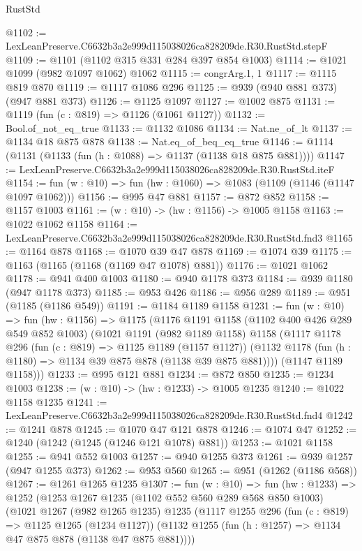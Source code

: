 \begin{lexlean}{RustStd}
\begin{coremodule}
@1102 := LexLeanPreserve.C6632b3a2e999d115038026ca828209de.R30.RustStd.stepF
@1109 := @1101 (@1102 @315 @331 @284 @397 @854 @1003)
@1114 := @1021 @1099 (@982 @1097 @1062) @1062
@1115 := congrArg.{1, 1}
@1117 := @1115 @819 @870
@1119 := @1117 @1086 @296
@1125 := @939 (@940 @881 @373) (@947 @881 @373)
@1126 := @1125 @1097
@1127 := @1002 @875
@1131 := @1119 (fun (c : @819) => @1126 (@1061 @1127))
@1132 := Bool.of_not_eq_true
@1133 := @1132 @1086
@1134 := Nat.ne_of_lt
@1137 := @1134 @18 @875 @878
@1138 := Nat.eq_of_beq_eq_true
@1146 := @1114 (@1131 (@1133 (fun (h : @1088) => @1137 (@1138 @18 @875 @881))))
@1147 := LexLeanPreserve.C6632b3a2e999d115038026ca828209de.R30.RustStd.iteF
@1154 := fun (w : @10) => fun (hw : @1060) => @1083 (@1109 (@1146 (@1147 @1097 @1062)))
@1156 := @995 @47 @881
@1157 := @872 @852
@1158 := @1157 @1003
@1161 := (w : @10) -> (hw : @1156) -> @1005 @1158
@1163 := @1022 @1062 @1158
@1164 := LexLeanPreserve.C6632b3a2e999d115038026ca828209de.R30.RustStd.fnd3
@1165 := @1164 @878
@1168 := @1070 @39 @47 @878
@1169 := @1074 @39
@1175 := @1163 (@1165 (@1168 (@1169 @47 @1078) @881))
@1176 := @1021 @1062
@1178 := @941 @400 @1003
@1180 := @940 @1178 @373
@1184 := @939 @1180 (@947 @1178 @373)
@1185 := @953 @426
@1186 := @956 @289
@1189 := @951 (@1185 (@1186 @549))
@1191 := @1184 @1189 @1158
@1231 := fun (w : @10) =>
  fun (hw : @1156) =>
  @1175
    (@1176
      @1191
      @1158
      (@1102 @400 @426 @289 @549 @852 @1003)
      (@1021
        @1191
        (@982 @1189 @1158)
        @1158
        (@1117
          @1178
          @296
          (fun (c : @819) => @1125 @1189 (@1157 @1127))
          (@1132 @1178 (fun (h : @1180) => @1134 @39 @875 @878 (@1138 @39 @875 @881))))
        (@1147 @1189 @1158)))
@1233 := @995 @121 @881
@1234 := @872 @850
@1235 := @1234 @1003
@1238 := (w : @10) -> (hw : @1233) -> @1005 @1235
@1240 := @1022 @1158 @1235
@1241 := LexLeanPreserve.C6632b3a2e999d115038026ca828209de.R30.RustStd.fnd4
@1242 := @1241 @878
@1245 := @1070 @47 @121 @878
@1246 := @1074 @47
@1252 := @1240 (@1242 (@1245 (@1246 @121 @1078) @881))
@1253 := @1021 @1158
@1255 := @941 @552 @1003
@1257 := @940 @1255 @373
@1261 := @939 @1257 (@947 @1255 @373)
@1262 := @953 @560
@1265 := @951 (@1262 (@1186 @568))
@1267 := @1261 @1265 @1235
@1307 := fun (w : @10) =>
  fun (hw : @1233) =>
  @1252
    (@1253
      @1267
      @1235
      (@1102 @552 @560 @289 @568 @850 @1003)
      (@1021
        @1267
        (@982 @1265 @1235)
        @1235
        (@1117
          @1255
          @296
          (fun (c : @819) => @1125 @1265 (@1234 @1127))
          (@1132 @1255 (fun (h : @1257) => @1134 @47 @875 @878 (@1138 @47 @875 @881))))

\end{coremodule}
\end{lexlean}
